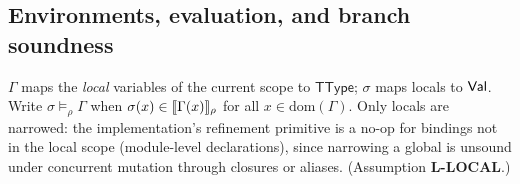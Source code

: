\documentclass[11pt]{article}
\newcommand{\TType}{\mathsf{TType}}
\newcommand{\Env}{\Gamma}
\begin{document}
\subsection{Environments, evaluation, and branch soundness}

\begin{definition}
$\Env$ maps the \emph{local} variables of the current scope to $\TType$;
$\sigma$ maps locals to $\mathsf{Val}$. Write $\sigma \models_\rho \Env$ when
$\sigma(x) \in \sem{\Env(x)}_\rho$ for all $x \in \mathrm{dom}(\Env)$.
Only locals are narrowed: the implementation's refinement primitive is a
no-op for bindings not in the local scope (module-level declarations), since
narrowing a global is unsound under concurrent mutation through
closures or aliases. (Assumption \textbf{L-LOCAL}.)
\end{definition}
\end{document}
